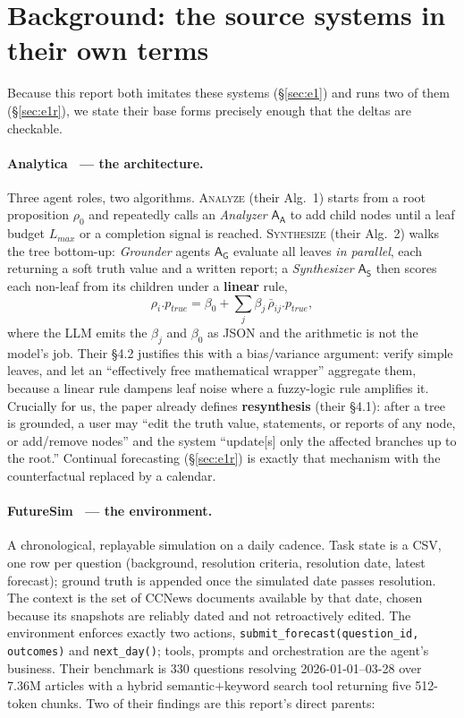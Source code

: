 \documentclass[10pt]{article}
\begin{document}
\section{Background: the source systems in their own terms}\label{sec:bg}
Because this report both imitates these systems (\S\ref{sec:e1}) and runs two of them
(\S\ref{sec:e1r}), we state their base forms precisely enough that the deltas are checkable.

\paragraph{Analytica~\cite{analytica} --- the architecture.}
Three agent roles, two algorithms. \textsc{Analyze} (their Alg.~1) starts from a root proposition
$\rho_0$ and repeatedly calls an \emph{Analyzer} $\mathsf{A_A}$ to add child nodes until a leaf
budget $L_{max}$ or a completion signal is reached. \textsc{Synthesize} (their Alg.~2) walks the
tree bottom-up: \emph{Grounder} agents $\mathsf{A_G}$ evaluate all leaves \emph{in parallel},
each returning a soft truth value and a written report; a \emph{Synthesizer} $\mathsf{A_S}$ then
scores each non-leaf from its children under a \textbf{linear} rule,
\[\rho_i.p_{true}=\beta_0+\sum_j \beta_j\,\bar\rho_{ij}.p_{true},\]
where the LLM emits the $\beta_j$ and $\beta_0$ as JSON and the arithmetic is not the model's job.
Their §4.2 justifies this with a bias/variance argument: verify simple leaves, and let an
``effectively free mathematical wrapper'' aggregate them, because a linear rule dampens leaf
noise where a fuzzy-logic rule amplifies it. Crucially for us, the paper already defines
\textbf{resynthesis} (their §4.1): after a tree is grounded, a user may ``edit the truth value,
statements, or reports of any node, or add/remove nodes'' and the system ``update[s] only the
affected branches up to the root.'' Continual forecasting (\S\ref{sec:e1r}) is exactly that
mechanism with the counterfactual replaced by a calendar.

\paragraph{FutureSim~\cite{futuresim} --- the environment.}
A chronological, replayable simulation on a daily cadence. Task state is a CSV, one row per
question (background, resolution criteria, resolution date, latest forecast); ground truth is
appended once the simulated date passes resolution. The context is the set of CCNews documents
available by that date, chosen because its snapshots are reliably dated and not retroactively
edited. The environment enforces exactly two actions,
\texttt{submit\_forecast(question\_id, outcomes)} and \texttt{next\_day()}; tools, prompts and
orchestration are the agent's business. Their benchmark is 330 questions resolving
2026-01-01--03-28 over 7.36M articles with a hybrid semantic$+$keyword search tool returning five
512-token chunks. Two of their findings are this report's direct parents:
\end{document}
